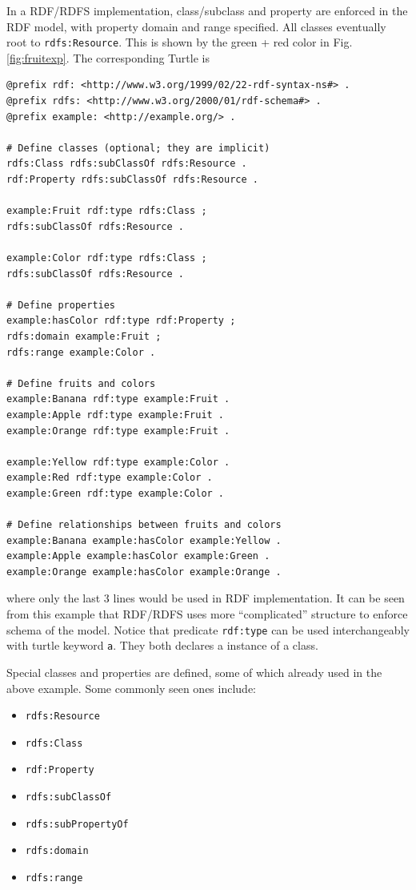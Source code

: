 In a RDF/RDFS implementation, class/subclass and property are enforced in the RDF model, with property domain and range specified. All classes eventually root to \verb|rdfs:Resource|. This is shown by the green + red color in Fig. \ref{fig:fruitexp}. The corresponding Turtle is
\begin{lstlisting}
@prefix rdf: <http://www.w3.org/1999/02/22-rdf-syntax-ns#> .
@prefix rdfs: <http://www.w3.org/2000/01/rdf-schema#> .
@prefix example: <http://example.org/> .

# Define classes (optional; they are implicit)
rdfs:Class rdfs:subClassOf rdfs:Resource .
rdf:Property rdfs:subClassOf rdfs:Resource .

example:Fruit rdf:type rdfs:Class ;
rdfs:subClassOf rdfs:Resource .

example:Color rdf:type rdfs:Class ;
rdfs:subClassOf rdfs:Resource .

# Define properties
example:hasColor rdf:type rdf:Property ;
rdfs:domain example:Fruit ;
rdfs:range example:Color .

# Define fruits and colors
example:Banana rdf:type example:Fruit .
example:Apple rdf:type example:Fruit .
example:Orange rdf:type example:Fruit .

example:Yellow rdf:type example:Color .
example:Red rdf:type example:Color .
example:Green rdf:type example:Color .

# Define relationships between fruits and colors
example:Banana example:hasColor example:Yellow .
example:Apple example:hasColor example:Green .
example:Orange example:hasColor example:Orange .

\end{lstlisting} 
where only the last 3 lines would be used in RDF implementation. It can be seen from this example that RDF/RDFS uses more ``complicated'' structure to enforce schema of the model. Notice that predicate \verb|rdf:type| can be used  interchangeably with turtle keyword \verb|a|. They both declares a instance of a class.

Special classes and properties are defined, some of which already used in the above example. Some commonly seen ones include:
\begin{itemize}
	\item \verb|rdfs:Resource|
	\item \verb|rdfs:Class|
	\item \verb|rdf:Property|
	\item \verb|rdfs:subClassOf|
	\item \verb|rdfs:subPropertyOf|
	\item \verb|rdfs:domain|
	\item \verb|rdfs:range|
\end{itemize}

